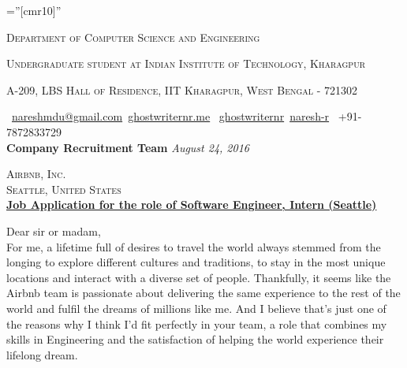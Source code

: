 \documentclass[a4paper,10pt]{extarticle} %
\begin{document}
\pagestyle{empty} %

\font\fb=''[cmr10]'' %


\par{\par} %
\par{\centering\large {\textsc{Department of Computer Science and Engineering}}\par}\large
\par{\centering\large {\textsc{Undergraduate student at Indian Institute of Technology, Kharagpur}}\par}\large
\par{\centering\large {\textsc{A-209, LBS Hall of Residence, IIT Kharagpur, West Bengal - 721302}}\par}\large
\hspace{0.5cm}\normalsize \faEnvelope\ {\href{mailto:nareshmdu@gmail.com}{nareshmdu@gmail.com}}\hfill \normalsize  \faGlobe\ {\href{http://ghostwriternr.me/}{ghostwriternr.me}} \hfill \normalsize \faGithub\ {\href{https://github.com/ghostwriternr}{ghostwriternr}}\hfill \normalsize  \faLinkedinSquare\ {\href{https://www.linkedin.com/in/naresh-r-464a8b8b}{naresh-r}} \hfill {\faPhone\ +91-7872833729} \hspace{0.5cm} \\[10pt]

\textbf{\large{Company Recruitment Team}} \hfill \textit{August 24, 2016}

\textsc{Airbnb, Inc.} \\
\textsc{Seattle, United States}\\

\underline{\textbf{Job Application for the role of  Software Engineer, Intern (Seattle)}}

Dear sir or madam,\\

For me, a lifetime full of desires to travel the world always stemmed from the longing to explore different cultures and traditions, to stay in the most unique locations and interact with a diverse set of people. Thankfully, it seems like the Airbnb team is passionate about delivering the same experience to the rest of the world and fulﬁl the dreams of millions like me. And I believe that’s just one of the reasons why I think I’d ﬁt perfectly in your team, a role that combines my skills in Engineering and the satisfaction of helping the world experience their lifelong dream. \\
\end{document}
